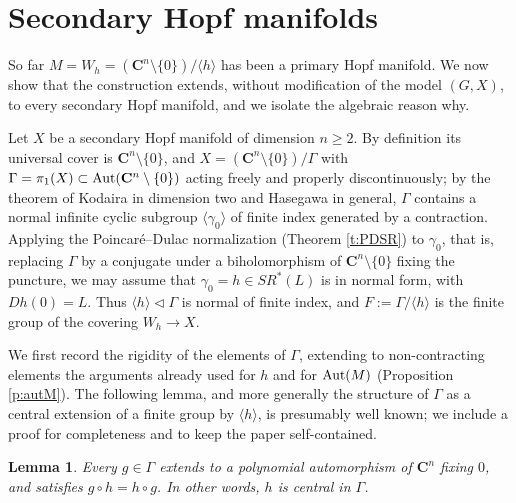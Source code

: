 \documentclass[english,11pt]{amsart}
\newtheorem{lemma}[theorem]{Lemma}
\theoremstyle{definition}
\theoremstyle{remark}
\numberwithin{equation}{section}
\newcommand{\C}{\mathbf{C}}
\newcommand{\Aut}{\mathop{\rm Aut}}
\begin{document}
\section{Secondary Hopf manifolds}\label{s:secondary}

So far $M=W_h=(\C^n\setminus\{0\})/\langle h\rangle$ has been a primary Hopf manifold. We now show that the construction extends, without modification of the model $(G,X)$, to every secondary Hopf manifold, and we isolate the algebraic reason why.

Let $X$ be a secondary Hopf manifold of dimension $n\geq2$. By definition its universal cover is $\C^n\setminus\{0\}$, and $X=(\C^n\setminus\{0\})/\Gamma$ with $\Gamma=\pi_1(X)\subset\Aut(\C^n\setminus\{0\})$ acting freely and properly discontinuously; by the theorem of Kodaira in dimension two and Hasegawa \cite{Hasegawa} in general, $\Gamma$ contains a normal infinite cyclic subgroup $\langle\gamma_0\rangle$ of finite index generated by a contraction. Applying the Poincar\'e--Dulac normalization (Theorem \ref{t:PDSR}) to $\gamma_0$, that is, replacing $\Gamma$ by a conjugate under a biholomorphism of $\C^n\setminus\{0\}$ fixing the puncture, we may assume that $\gamma_0=h\in SR^*(L)$ is in normal form, with $D h(0)=L$. Thus $\langle h\rangle\lhd\Gamma$ is normal of finite index, and $F:=\Gamma/\langle h\rangle$ is the finite group of the covering $W_h\to X$.

We first record the rigidity of the elements of $\Gamma$, extending to non-contracting elements the arguments already used for $h$ and for $\Aut(M)$ (Proposition \ref{p:autM}). The following lemma, and more generally the structure of $\Gamma$ as a central extension of a finite group by $\langle h\rangle$, is presumably well known; we include a proof for completeness and to keep the paper self-contained.

\begin{lemma}\label{l:secondary-lift}
Every $g\in\Gamma$ extends to a polynomial automorphism of $\C^n$ fixing $0$, and satisfies $g\circ h=h\circ g$. In other words, $h$ is central in $\Gamma$.
\end{lemma}
\end{document}
